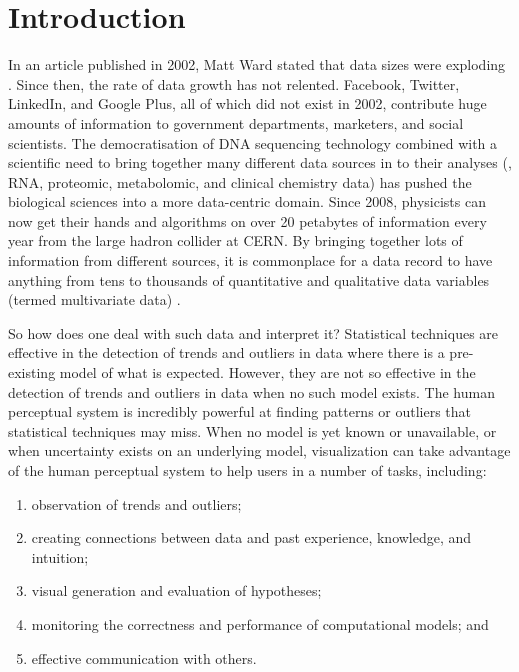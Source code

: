 \chapter{Introduction}
\label{chap:introduction}

In an article published in 2002, Matt Ward stated that data sizes were exploding \cite{ward02}.
Since then, the rate of data growth has not relented.
Facebook, Twitter, LinkedIn, and Google Plus, all of which did not exist in 2002, contribute huge amounts of information to government departments, marketers, and social scientists.
The democratisation of DNA sequencing technology combined with a scientific need to bring together many different data sources in to their analyses (\eg, RNA, proteomic, metabolomic, and clinical chemistry data) has pushed the biological sciences into a more data-centric domain.
Since 2008, physicists can now get their hands and algorithms on over 20 petabytes of information every year from the large hadron collider at CERN.
By bringing together lots of information from different sources, it is commonplace for a data record to have anything from tens to thousands of quantitative and qualitative data variables (termed multivariate data) \cite{ward02}.

So how does one deal with such data and interpret it?
Statistical techniques are effective in the detection of trends and outliers in data where there is a pre-existing model of what is expected.
However, they are not so effective in the detection of trends and outliers in data when no such model exists.
The human perceptual system is incredibly powerful at finding patterns or outliers that statistical techniques may miss.
When no model is yet known or unavailable, or when uncertainty exists on an underlying model, visualization can take advantage of the human perceptual system to help users in a number of tasks, including:
\begin{enumerate}
\item observation of trends and outliers;
\item creating connections between data and past experience, knowledge, and intuition;
\item visual generation and evaluation of hypotheses;
\item monitoring the correctness and performance of computational models; and 
\item effective communication with others.
\end{enumerate}

